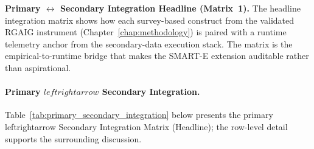 \noindent\textbf{Primary $\leftrightarrow$ Secondary Integration Headline (Matrix~1).} The headline integration matrix shows how each survey-based construct from the validated RGAIG instrument (Chapter~\ref{chap:methodology}) is paired with a runtime telemetry anchor from the secondary-data execution stack. The matrix is the empirical-to-runtime bridge that makes the SMART-E extension auditable rather than aspirational.

\paragraph{Primary $leftrightarrow$ Secondary Integration.}
\noindent Table~\ref{tab:primary_secondary_integration} below presents the primary leftrightarrow Secondary Integration Matrix (Headline); the row-level detail supports the surrounding discussion.



